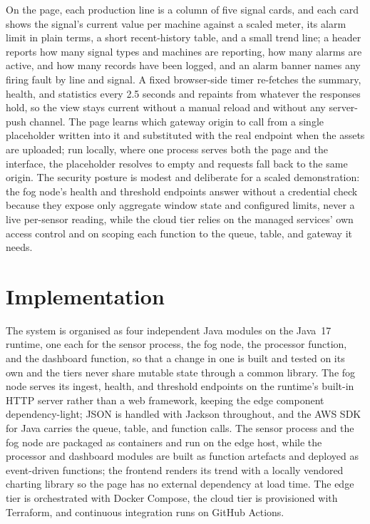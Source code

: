 \documentclass[conference]{IEEEtran}
\begin{document}
On the page, each production line is a column of five signal cards, and each card shows the signal's current value per machine against a scaled meter, its alarm limit in plain terms, a short recent-history table, and a small trend line; a header reports how many signal types and machines are reporting, how many alarms are active, and how many records have been logged, and an alarm banner names any firing fault by line and signal. A fixed browser-side timer re-fetches the summary, health, and statistics every 2.5 seconds and repaints from whatever the responses hold, so the view stays current without a manual reload and without any server-push channel. The page learns which gateway origin to call from a single placeholder written into it and substituted with the real endpoint when the assets are uploaded; run locally, where one process serves both the page and the interface, the placeholder resolves to empty and requests fall back to the same origin. The security posture is modest and deliberate for a scaled demonstration: the fog node's health and threshold endpoints answer without a credential check because they expose only aggregate window state and configured limits, never a live per-sensor reading, while the cloud tier relies on the managed services' own access control and on scoping each function to the queue, table, and gateway it needs.

\section{Implementation}

The system is organised as four independent Java modules on the Java~17 runtime, one each for the sensor process, the fog node, the processor function, and the dashboard function, so that a change in one is built and tested on its own and the tiers never share mutable state through a common library. The fog node serves its ingest, health, and threshold endpoints on the runtime's built-in HTTP server rather than a web framework, keeping the edge component dependency-light; JSON is handled with Jackson throughout, and the AWS SDK for Java carries the queue, table, and function calls. The sensor process and the fog node are packaged as containers and run on the edge host, while the processor and dashboard modules are built as function artefacts and deployed as event-driven functions; the frontend renders its trend with a locally vendored charting library so the page has no external dependency at load time. The edge tier is orchestrated with Docker Compose, the cloud tier is provisioned with Terraform, and continuous integration runs on GitHub Actions.
\end{document}
